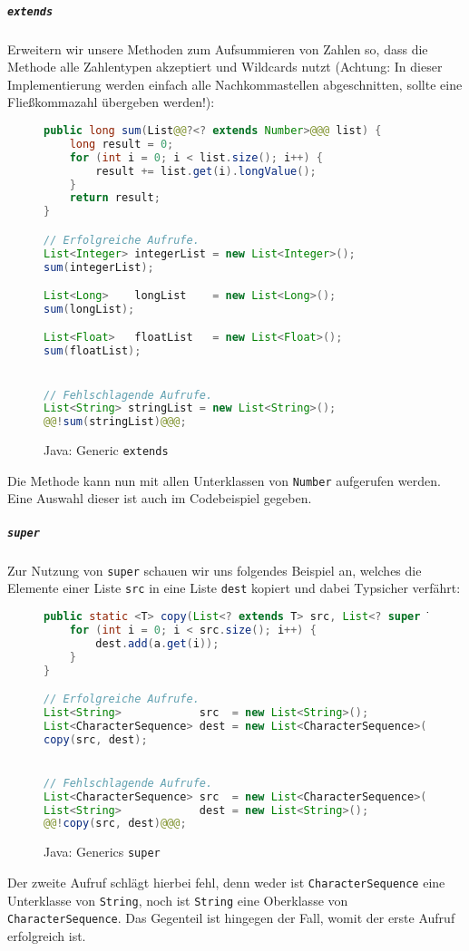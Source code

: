 			\subparagraph{\texttt{extends}}
				Erweitern wir unsere Methoden zum Aufsummieren von Zahlen so, dass die Methode alle Zahlentypen akzeptiert und Wildcards nutzt (Achtung: In dieser Implementierung werden einfach alle Nachkommastellen abgeschnitten, sollte eine Fließkommazahl übergeben werden!):
				\begin{figure}[H]
					\centering
					\begin{lstlisting}[language = Java, style = base]
public long sum(List@@?<? extends Number>@@@ list) {
	long result = 0;
	for (int i = 0; i < list.size(); i++) {
		result += list.get(i).longValue();
	}
	return result;
}

// Erfolgreiche Aufrufe.
List<Integer> integerList = new List<Integer>();
sum(integerList);

List<Long>    longList    = new List<Long>();
sum(longList);

List<Float>   floatList   = new List<Float>();
sum(floatList);


// Fehlschlagende Aufrufe.
List<String> stringList = new List<String>();
@@!sum(stringList)@@@;
					\end{lstlisting}
					\caption{Java: Generic \texttt{extends}}
				\end{figure}
				Die Methode kann nun mit allen Unterklassen von \texttt{Number} aufgerufen werden. Eine Auswahl dieser ist auch im Codebeispiel gegeben.
			
			\subparagraph{\texttt{super}}
				Zur Nutzung von \texttt{super} schauen wir uns folgendes Beispiel an, welches die Elemente einer Liste \texttt{src} in eine Liste \texttt{dest} kopiert und dabei Typsicher verfährt:
				\begin{figure}[H]
					\centering
					\begin{lstlisting}[language = Java, style = base]
public static <T> copy(List<? extends T> src, List<? super T> dest) {
	for (int i = 0; i < src.size(); i++) {
		dest.add(a.get(i));
	}
}

// Erfolgreiche Aufrufe.
List<String>            src  = new List<String>();
List<CharacterSequence> dest = new List<CharacterSequence>();
copy(src, dest);


// Fehlschlagende Aufrufe.
List<CharacterSequence> src  = new List<CharacterSequence>();
List<String>            dest = new List<String>();
@@!copy(src, dest)@@@;
					\end{lstlisting}
					\caption{Java: Generics \texttt{super}}
				\end{figure}
				Der zweite Aufruf schlägt hierbei fehl, denn weder ist \texttt{CharacterSequence} eine Unterklasse von \texttt{String}, noch ist \texttt{String} eine Oberklasse von \texttt{CharacterSequence}. Das Gegenteil ist hingegen der Fall, womit der erste Aufruf erfolgreich ist.
			
